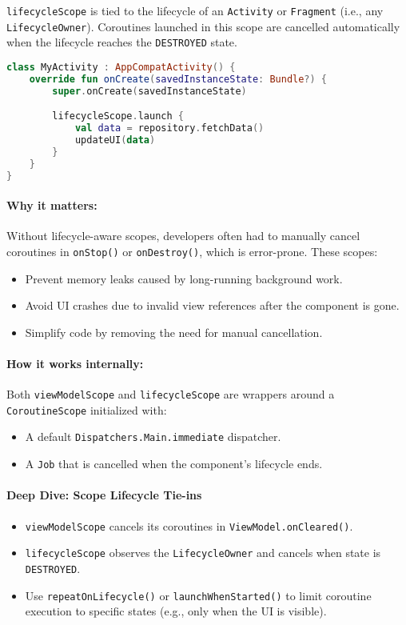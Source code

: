 \documentclass[a4paper,12pt]{article}
\begin{document}
\texttt{lifecycleScope} is tied to the lifecycle of an \texttt{Activity} or \texttt{Fragment} (i.e., any \texttt{LifecycleOwner}). Coroutines launched in this scope are cancelled automatically when the lifecycle reaches the \texttt{DESTROYED} state.

\begin{lstlisting}[language=Kotlin]
class MyActivity : AppCompatActivity() {
    override fun onCreate(savedInstanceState: Bundle?) {
        super.onCreate(savedInstanceState)

        lifecycleScope.launch {
            val data = repository.fetchData()
            updateUI(data)
        }
    }
}
\end{lstlisting}

\paragraph{Why it matters:}

Without lifecycle-aware scopes, developers often had to manually cancel coroutines in \texttt{onStop()} or \texttt{onDestroy()}, which is error-prone. These scopes:
\begin{itemize}
  \item Prevent memory leaks caused by long-running background work.
  \item Avoid UI crashes due to invalid view references after the component is gone.
  \item Simplify code by removing the need for manual cancellation.
\end{itemize}

\paragraph{How it works internally:}
Both \texttt{viewModelScope} and \texttt{lifecycleScope} are wrappers around a \texttt{CoroutineScope} initialized with:
\begin{itemize}
  \item A default \texttt{Dispatchers.Main.immediate} dispatcher.
  \item A \texttt{Job} that is cancelled when the component's lifecycle ends.
\end{itemize}

\paragraph{Deep Dive: Scope Lifecycle Tie-ins}

\begin{itemize}
  \item \texttt{viewModelScope} cancels its coroutines in \texttt{ViewModel.onCleared()}.
  \item \texttt{lifecycleScope} observes the \texttt{LifecycleOwner} and cancels when state is \texttt{DESTROYED}.
  \item Use \texttt{repeatOnLifecycle()} or \texttt{launchWhenStarted()} to limit coroutine execution to specific states (e.g., only when the UI is visible).
\end{itemize}
\end{document}
